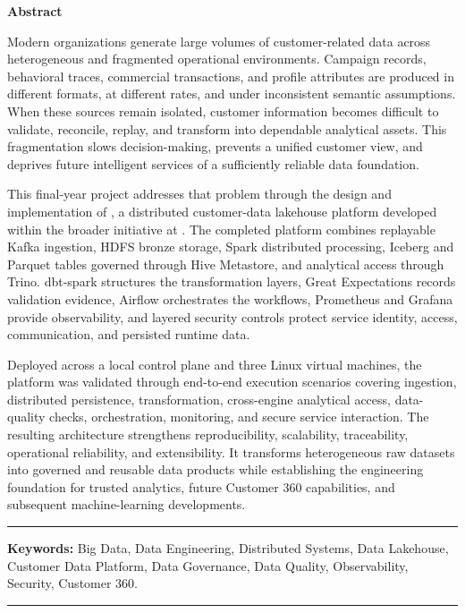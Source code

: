 \clearpage
{}
{}
\thispagestyle{plain}
\vspace*{-0.55cm}
{\Huge\bfseries Abstract\par}
\vspace{0.65cm}

Modern organizations generate large volumes of customer-related data across heterogeneous and fragmented operational environments. Campaign records, behavioral traces, commercial transactions, and profile attributes are produced in different formats, at different rates, and under inconsistent semantic assumptions. When these sources remain isolated, customer information becomes difficult to validate, reconcile, replay, and transform into dependable analytical assets. This fragmentation slows decision-making, prevents a unified customer view, and deprives future intelligent services of a sufficiently reliable data foundation.

This final-year project addresses that problem through the design and implementation of \projectname{}, a distributed customer-data lakehouse platform developed within the broader \initiative{} initiative at \companyname. The completed platform combines replayable Kafka ingestion, HDFS bronze storage, Spark distributed processing, Iceberg and Parquet tables governed through Hive Metastore, and analytical access through Trino. dbt-spark structures the transformation layers, Great Expectations records validation evidence, Airflow orchestrates the workflows, Prometheus and Grafana provide observability, and layered security controls protect service identity, access, communication, and persisted runtime data.

Deployed across a local control plane and three Linux virtual machines, the platform was validated through end-to-end execution scenarios covering ingestion, distributed persistence, transformation, cross-engine analytical access, data-quality checks, orchestration, monitoring, and secure service interaction. The resulting architecture strengthens reproducibility, scalability, traceability, operational reliability, and extensibility. It transforms heterogeneous raw datasets into governed and reusable data products while establishing the engineering foundation for trusted analytics, future Customer 360 capabilities, and subsequent machine-learning developments.

\vspace{0.18cm}
\noindent\rule{\textwidth}{0.4pt}

\vspace{0.08cm}
{\fontsize{9}{10.2}\selectfont\noindent\textbf{Keywords: }Big Data, Data Engineering, Distributed Systems, Data Lakehouse, Customer Data Platform, Data Governance, Data Quality, Observability, Security, Customer 360.\par}

\vspace{0.08cm}
\noindent\rule{\textwidth}{0.4pt}

\clearpage
